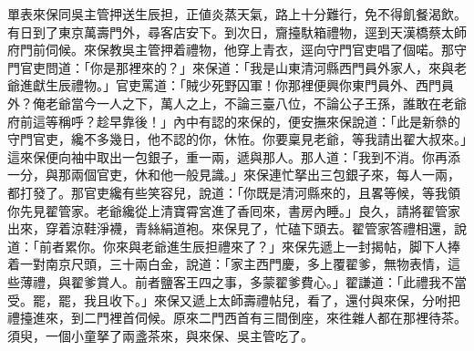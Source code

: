 單表來保同吳主管押送生辰担，正値炎蒸天氣，路上十分難行，免不得飢餐渴飲。有日到了東京萬壽門外，尋客店安下。到次日，齎擡馱箱禮物，逕到天漢橋蔡太師府門前伺候。來保教吳主管押着禮物，他穿上青衣，逕向守門官吏唱了個喏。那守門官吏問道：「你是那裡來的？」來保道：「我是山東清河縣西門員外家人，{}來與老爺進獻生辰禮物。」官吏罵道：「賊少死野囚軍！你那裡便興你東門員外、西門員外？俺老爺當今一人之下，萬人之上，不論三臺八位，不論公子王孫，誰敢在老爺府前這等稱呼？{}趁早靠後！」內中有認的來保的，便安撫來保說道：「此是新叅的守門官吏，纔不多幾日，他不認的你，休恠。你要稟見老爺，等我請出翟大叔來。」這來保便向袖中取出一包銀子，重一兩，遞與那人。那人道：「我到不消。你再添一分，與那兩個官吏，休和他一般見識。」{}來保連忙拏出三包銀子來，每人一兩，都打發了。那官吏纔有些笑容兒，說道：「你既是清河縣來的，且畧等候，等我領你先見翟管家。老爺纔從上清寶霄宮進了香囘來，書房內睡。」良久，請將翟管家出來，穿着涼鞋淨襪，青絲絹道袍。來保見了，忙磕下頭去。翟管家答禮相還，說道：「前者累你。你來與老爺進生辰担禮來了？」來保先遞上一封揭帖，脚下人捧着一對南京尺頭，三十兩白金，說道：「家主西門慶，多上覆翟爹，無物表情，這些薄禮，與翟爹賞人。前者鹽客王四之事，多蒙翟爹費心。」翟謙道：「此禮我不當受。罷，罷，我且收下。」來保又遞上太師壽禮帖兒，看了，還付與來保，分咐把禮擡進來，到二門裡首伺候。原來二門西首有三間倒座，來徃雜人都在那裡待茶。須臾，一個小童拏了兩盞茶來，與來保、吳主管吃了。

